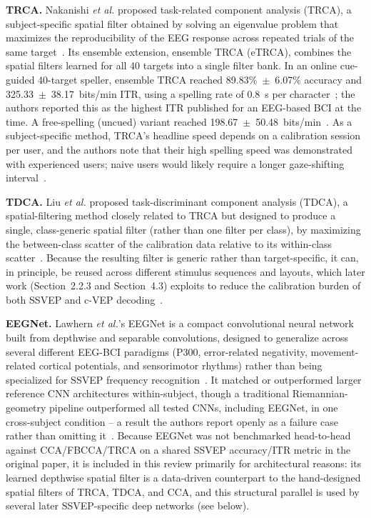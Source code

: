 \documentclass[11pt]{article}
\begin{document}
\textbf{TRCA.} Nakanishi \textit{et al.} proposed task-related component analysis (TRCA), a subject-specific spatial filter obtained by solving an eigenvalue problem that maximizes the reproducibility of the EEG response across repeated trials of the same target~\cite{nakanishi2018trca}. Its ensemble extension, ensemble TRCA (eTRCA), combines the spatial filters learned for all 40 targets into a single filter bank. In an online cue-guided 40-target speller, ensemble TRCA reached 89.83\%~$\pm$~6.07\% accuracy and 325.33~$\pm$~38.17~bits/min ITR, using a spelling rate of 0.8~s per character~\cite{nakanishi2018trca}; the authors reported this as the highest ITR published for an EEG-based BCI at the time. A free-spelling (uncued) variant reached 198.67~$\pm$~50.48~bits/min~\cite{nakanishi2018trca}. As a subject-specific method, TRCA's headline speed depends on a calibration session per user, and the authors note that their high spelling speed was demonstrated with experienced users; naive users would likely require a longer gaze-shifting interval~\cite{nakanishi2018trca}.

\textbf{TDCA.} Liu \textit{et al.} proposed task-discriminant component analysis (TDCA), a spatial-filtering method closely related to TRCA but designed to produce a single, class-generic spatial filter (rather than one filter per class), by maximizing the between-class scatter of the calibration data relative to its within-class scatter~\cite{liu2021tdca}. Because the resulting filter is generic rather than target-specific, it can, in principle, be reused across different stimulus sequences and layouts, which later work (Section~2.2.3 and Section~4.3) exploits to reduce the calibration burden of both SSVEP and c-VEP decoding~\cite{liu2021tdca}.

\textbf{EEGNet.} Lawhern \textit{et al.}'s EEGNet is a compact convolutional neural network built from depthwise and separable convolutions, designed to generalize across several different EEG-BCI paradigms (P300, error-related negativity, movement-related cortical potentials, and sensorimotor rhythms) rather than being specialized for SSVEP frequency recognition~\cite{lawhern2018eegnet}. It matched or outperformed larger reference CNN architectures within-subject, though a traditional Riemannian-geometry pipeline outperformed all tested CNNs, including EEGNet, in one cross-subject condition -- a result the authors report openly as a failure case rather than omitting it~\cite{lawhern2018eegnet}. Because EEGNet was not benchmarked head-to-head against CCA/FBCCA/TRCA on a shared SSVEP accuracy/ITR metric in the original paper, it is included in this review primarily for architectural reasons: its learned depthwise spatial filter is a data-driven counterpart to the hand-designed spatial filters of TRCA, TDCA, and CCA, and this structural parallel is used by several later SSVEP-specific deep networks (see below).
\end{document}
